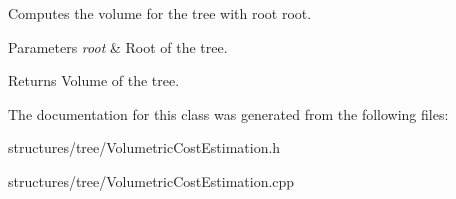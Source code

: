 Computes the volume for the tree with root {\ttfamily root}. 
\begin{DoxyParams}{Parameters}
{\em root} & Root of the tree. \\
\hline
\end{DoxyParams}
\begin{DoxyReturn}{Returns}
Volume of the tree. 
\end{DoxyReturn}


The documentation for this class was generated from the following files\+:\begin{DoxyCompactItemize}
\item 
structures/tree/Volumetric\+Cost\+Estimation.\+h\item 
structures/tree/Volumetric\+Cost\+Estimation.\+cpp\end{DoxyCompactItemize}
